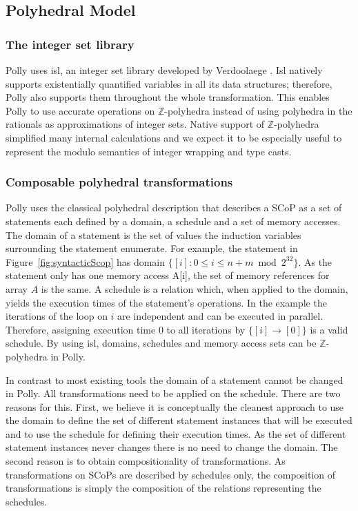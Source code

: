 \documentclass{acm_proc_article-sp}
\begin{document}
\subsection{Polyhedral Model}

\subsubsection{The integer set library} Polly uses isl, an integer set library
developed by Verdoolaege \cite{Verdoolaege10}. Isl natively supports
existentially quantified variables in all its data structures; therefore, Polly
also supports them throughout the whole transformation. This enables Polly to
use accurate operations on $\mathbb{Z}$-polyhedra instead of using polyhedra
in the rationals as approximations of integer sets.
Native support of $\mathbb{Z}$-polyhedra
simplified many internal calculations and we
expect it to be especially useful to represent the modulo semantics of integer
wrapping and type casts.


\subsubsection{Composable polyhedral transformations}
Polly uses the classical polyhedral description \cite{girbal}
that describes a SCoP as a
set of statements each defined by a domain, a schedule and a set of memory
accesses. The domain of a statement is the set of values the induction
variables surrounding the statement enumerate. For example, the statement in
Figure~\ref{fig:syntacticScop} has domain $\{[i]: 0\leq i\leq n+m\bmod 2^{32}\}$.
As the statement only has one memory access A[i], the set of memory
references for array $A$ is the same. A schedule is a relation which, when
applied to the domain, yields the execution times of the statement's
operations. In the example the iterations of the loop on $i$ are independent and
can be executed in parallel. Therefore, assigning execution time 0 to all
iterations by $\{[i] \rightarrow [0]\}$ is a valid schedule. By using isl, domains,
schedules and memory access sets can be $\mathbb{Z}$-polyhedra in Polly.

In contrast to most existing tools the domain of a statement cannot be changed
in Polly. All transformations need to be applied on the schedule. There
are two reasons for this. First, we believe it is
conceptually the cleanest approach to use the domain to define the set of
different statement instances that will be executed and to use the schedule for
defining their execution times. As the set of different statement instances
never changes there is no need to change the domain. The second reason is to
obtain compositionality of transformations. As transformations on SCoPs are
described by schedules only, the composition of transformations is simply the
composition of the relations representing the schedules.
\end{document}
